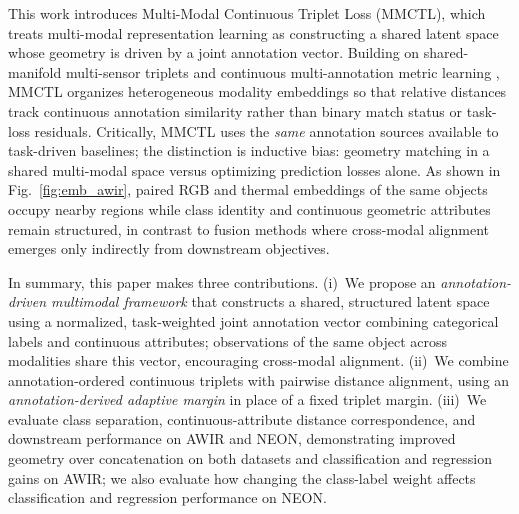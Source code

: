 \documentclass[10pt,twocolumn,letterpaper]{article}
\newcommand{\new}[1]{#1}
\begin{document}
This work introduces Multi-Modal Continuous Triplet Loss (MMCTL), which treats multi-modal representation learning as constructing a shared latent space whose geometry is driven by a joint annotation vector. Building on shared-manifold multi-sensor triplets \cite{dutt2022shared} and continuous multi-annotation metric learning \cite{zhou2025multi,kim2019deep}, MMCTL organizes heterogeneous modality embeddings so that relative distances track continuous annotation similarity rather than binary match status or task-loss residuals. Critically, MMCTL uses the \emph{same} annotation sources available to task-driven baselines; the distinction is inductive bias: geometry matching in a shared multi-modal space versus optimizing prediction losses alone. As shown in Fig.~\ref{fig:emb_awir}, paired RGB and thermal embeddings of the same objects occupy nearby regions while class identity and continuous geometric attributes remain structured, in contrast to fusion methods where cross-modal alignment emerges only indirectly from downstream objectives.

\new{In summary, this paper makes three contributions. (i)~We propose an \emph{annotation-driven multimodal framework} that constructs a shared, structured latent space using a normalized, task-weighted joint annotation vector combining categorical labels and continuous attributes; observations of the same object across modalities share this vector, encouraging cross-modal alignment. (ii)~We combine annotation-ordered continuous triplets with pairwise distance alignment, using an \emph{annotation-derived adaptive margin} in place of a fixed triplet margin. (iii)~We evaluate class separation, continuous-attribute distance correspondence, and downstream performance on AWIR and NEON, demonstrating improved geometry over concatenation on both datasets and classification and regression gains on AWIR; we also evaluate how changing the class-label weight affects classification and regression performance on NEON.}

\end{document}
